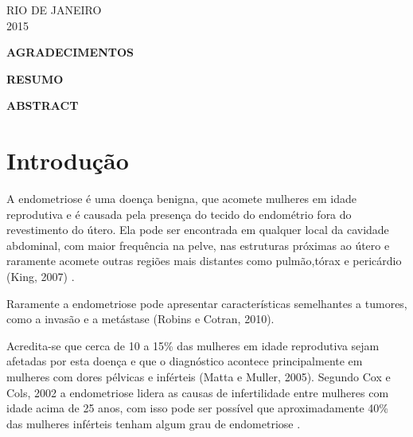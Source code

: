 \documentclass[12pt]{article} %
\begin{document}
\begin{center}
\MakeUppercase{Rio de Janeiro}\\
2015
\end{center}

\newpage

\begin{center}
\MakeUppercase{\textbf{Agradecimentos}}
\end{center}

\newpage
\begin{center}
\MakeUppercase{\textbf{Resumo}}
\end{center}

\newpage
\begin{center}
\MakeUppercase{\textbf{Abstract}}
\end{center}



\newpage

\listoffigures



\newpage

\tableofcontents










\newpage








\newpage


\section{Introdução}
A endometriose é uma doença benigna, que acomete mulheres em idade reprodutiva e é causada pela presença do tecido do endométrio fora do revestimento do útero. Ela pode ser encontrada em qualquer local da cavidade abdominal, com maior frequência na pelve, nas estruturas próximas ao útero e raramente acomete outras regiões mais distantes como pulmão,tórax e pericárdio (King, 2007) .

Raramente a endometriose pode apresentar características semelhantes a tumores, como a invasão e a metástase (Robins e Cotran, 2010).

Acredita-se que cerca de 10 a 15\%  das mulheres em idade reprodutiva sejam afetadas por esta doença e que o diagnóstico acontece principalmente em mulheres com dores pélvicas e inférteis (Matta e Muller, 2005).
Segundo Cox e Cols, 2002 a endometriose lidera as causas de infertilidade entre mulheres com idade acima de 25 anos, com isso pode ser possível que aproximadamente 40\% das mulheres inférteis tenham algum grau de endometriose .
\end{document}

